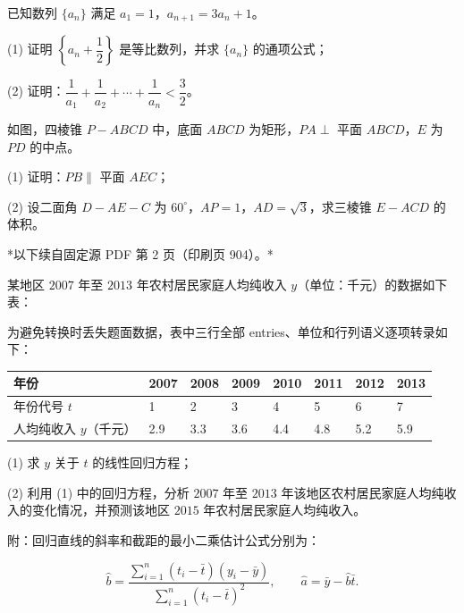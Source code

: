 \begin{question}
已知数列 $\{a_n\}$ 满足 $a_1=1$，$a_{n+1}=3a_n+1$。

(1) 证明 $\left\{a_n+\dfrac12\right\}$ 是等比数列，并求 $\{a_n\}$ 的通项公式；

(2) 证明：$\dfrac1{a_1}+\dfrac1{a_2}+\cdots+\dfrac1{a_n}<\dfrac32$。

\Needspace{0.4\textheight}
\end{question}
\begin{question}
如图，四棱锥 $P-ABCD$ 中，底面 $ABCD$ 为矩形，$PA\perp$ 平面 $ABCD$，$E$ 为 $PD$ 的中点。
\nopagebreak[4]
\begin{center}\end{center}
\nopagebreak[4]
(1) 证明：$PB\parallel$ 平面 $AEC$；

(2) 设二面角 $D-AE-C$ 为 $60^\circ$，$AP=1$，$AD=\sqrt3$，求三棱锥 $E-ACD$ 的体积。

\par\medskip

*以下续自固定源 PDF 第 2 页（印刷页 904）。*

\Needspace{0.4\textheight}
\end{question}
\begin{question}
某地区 $2007$ 年至 $2013$ 年农村居民家庭人均纯收入 $y$（单位：千元）的数据如下表：
\nopagebreak[4]
\begin{center}\end{center}
\nopagebreak[4]
为避免转换时丢失题面数据，表中三行全部 entries、单位和行列语义逐项转录如下：

\begin{center}
\begingroup\setlength{\tabcolsep}{4pt}
\begin{tabular}{llllllll}
\toprule
年份 & 2007 & 2008 & 2009 & 2010 & 2011 & 2012 & 2013 \\
\midrule
年份代号 $t$ & 1 & 2 & 3 & 4 & 5 & 6 & 7 \\
人均纯收入 $y$（千元） & 2.9 & 3.3 & 3.6 & 4.4 & 4.8 & 5.2 & 5.9 \\
\bottomrule
\end{tabular}
\endgroup
\end{center}

(1) 求 $y$ 关于 $t$ 的线性回归方程；

(2) 利用 (1) 中的回归方程，分析 $2007$ 年至 $2013$ 年该地区农村居民家庭人均纯收入的变化情况，并预测该地区 $2015$ 年农村居民家庭人均纯收入。

附：回归直线的斜率和截距的最小二乘估计公式分别为：

\nopagebreak[4]
\[
\hat b=\frac{\sum_{i=1}^n(t_i-\bar t)(y_i-\bar y)}{\sum_{i=1}^n(t_i-\bar t)^2},\qquad \hat a=\bar y-\hat b\bar t.
\]

\end{question}
